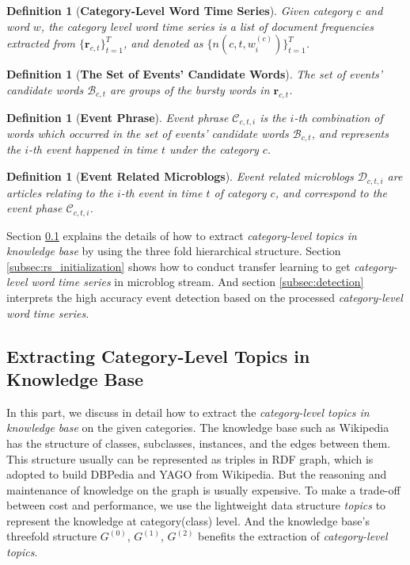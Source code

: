 \documentclass[runningheads,a4paper]{llncs}
\theoremstyle{exampstyle}
\newtheorem{rmkWithoutSpacing}[thm]{Definition}
\begin{document}
\begin{rmkWithoutSpacing}[\textbf{Category-Level Word Time Series}] 
Given category \(c\) and word \(w\), the category level word time series is a list of document frequencies extracted from \(\{\bm{r}_{c,t}\}_{t=1}^{T}\), and denoted as \(\{n(c,t,w^{(c)}_{i})\}_{t=1}^{T}\).
\end{rmkWithoutSpacing}


\begin{rmkWithoutSpacing}[\textbf{The Set of Events' Candidate Words}] 
The set of events' candidate words \(\mathcal{B}_{c,t}\) are groups of the bursty words in \(\bm{r}_{c,t}\).
\end{rmkWithoutSpacing}

\begin{rmkWithoutSpacing}[\textbf{Event Phrase}] 
Event phrase \(\mathcal{C}_{c,t,i}\) is the \(i\)-th combination of words which occurred in the set of events' candidate words \(\mathcal{B}_{c,t}\), and represents the \(i\)-th event happened in time \(t\) under the category \(c\).
\end{rmkWithoutSpacing}

\begin{rmkWithoutSpacing}[\textbf{Event Related Microblogs}] Event related microblogs \(\mathcal{D}_{c,t,i}\) are articles relating to the \(i\)-th event in time \(t\) of category \(c\), and correspond to the event phase \(\mathcal{C}_{c,t,i}\).
\end{rmkWithoutSpacing}


Section \ref{subsec:hs_initialization} explains the details of how to extract \textit{category-level topics in knowledge base} by using the three fold hierarchical structure.
Section \ref{subsec:rs_initialization} shows how to conduct transfer learning to get \textit{category-level word time series} in microblog stream.
And section \ref{subsec:detection} interprets the high accuracy event detection based on the processed \textit{category-level word time series}.

\subsection{Extracting Category-Level Topics in Knowledge Base}\label{subsec:hs_initialization}
In this part, we discuss in detail how to extract the \textit{category-level topics in knowledge base} on the given categories. 
The knowledge base such as Wikipedia has the structure of classes, subclasses, instances, and the edges between them. 
This structure usually can be represented as triples in RDF graph\cite{klyne2006rdf}, which is adopted to build DBPedia\cite{auer2007dbpedia} and YAGO\cite{suchanek2007yago} from Wikipedia. 
But the reasoning and maintenance of knowledge on the graph is usually expensive\cite{bursztyn2015reasoning}. 
To make a trade-off between cost and performance, we use the lightweight data structure \textit{topics} to represent the knowledge at category(class) level.
And the knowledge base's threefold structure \(G^{(0)}\), \(G^{(1)}\), \(G^{(2)}\) benefits the extraction of \textit{category-level topics}. 
\end{document}
